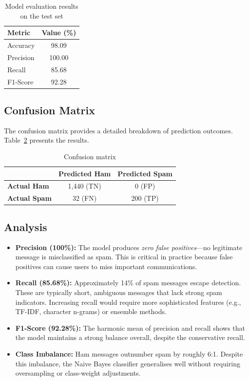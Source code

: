 \documentclass[paper=a4, fontsize=11pt]{scrartcl}
\numberwithin{equation}{section}
\numberwithin{figure}{section}
\numberwithin{table}{section}
\begin{document}
\begin{table}[h]
\centering
\caption{Model evaluation results on the test set}
\label{tab:results}
\begin{tabular}{@{} l c @{}}
\toprule
\textbf{Metric} & \textbf{Value (\%)} \\
\midrule
Accuracy  & 98.09 \\
Precision & 100.00 \\
Recall    & 85.68 \\
F1-Score  & 92.28 \\
\bottomrule
\end{tabular}
\end{table}

\subsection{Confusion Matrix}
The confusion matrix provides a detailed breakdown of prediction outcomes.  Table~\ref{tab:cm} presents the results.

\begin{table}[h]
\centering
\caption{Confusion matrix}
\label{tab:cm}
\begin{tabular}{@{} l c c @{}}
\toprule
 & \textbf{Predicted Ham} & \textbf{Predicted Spam} \\
\midrule
\textbf{Actual Ham}  & 1,440 (TN) & 0 (FP) \\
\textbf{Actual Spam} & 32 (FN)    & 200 (TP) \\
\bottomrule
\end{tabular}
\end{table}

\subsection{Analysis}
\begin{itemize}
    \item \textbf{Precision (100\%):} The model produces \textit{zero false positives}—no legitimate message is misclassified as spam.  This is critical in practice because false positives can cause users to miss important communications.
    \item \textbf{Recall (85.68\%):} Approximately 14\% of spam messages escape detection.  These are typically short, ambiguous messages that lack strong spam indicators.  Increasing recall would require more sophisticated features (e.g., TF-IDF, character n-grams) or ensemble methods.
    \item \textbf{F1-Score (92.28\%):} The harmonic mean of precision and recall shows that the model maintains a strong balance overall, despite the conservative recall.
    \item \textbf{Class Imbalance:} Ham messages outnumber spam by roughly 6:1.  Despite this imbalance, the Naive Bayes classifier generalises well without requiring oversampling or class-weight adjustments.
\end{itemize}
\end{document}
